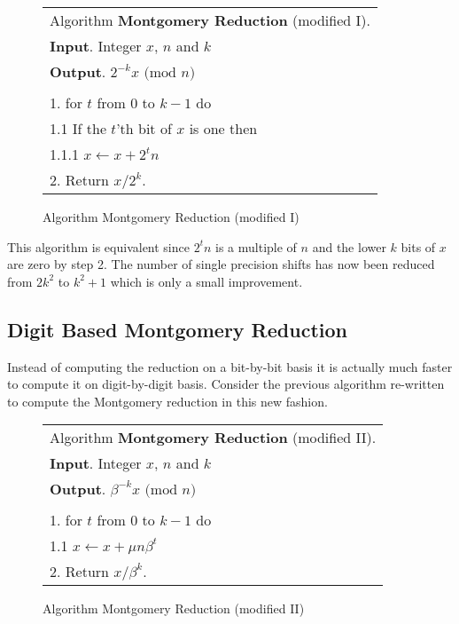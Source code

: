 \documentclass[b5paper]{book}
\begin{document}
\begin{figure}[!here]
\begin{small}
\begin{center}
\begin{tabular}{l}
\hline Algorithm \textbf{Montgomery Reduction} (modified I). \\
\textbf{Input}.   Integer $x$, $n$ and $k$ \\
\textbf{Output}.  $2^{-k}x \mbox{ (mod }n\mbox{)}$ \\
\hline \\
1.  for $t$ from $0$ to $k - 1$ do \\
\hspace{3mm}1.1  If the $t$'th bit of $x$ is one then \\
\hspace{6mm}1.1.1  $x \leftarrow x + 2^tn$ \\
2.  Return $x/2^k$. \\
\hline
\end{tabular}
\end{center}
\end{small}
\caption{Algorithm Montgomery Reduction (modified I)}
\end{figure}

This algorithm is equivalent since $2^tn$ is a multiple of $n$ and the lower $k$ bits of $x$ are zero by step 2.  The number of single
precision shifts has now been reduced from $2k^2$ to $k^2 + 1$ which is only a small improvement.

\subsection{Digit Based Montgomery Reduction}
Instead of computing the reduction on a bit-by-bit basis it is actually much faster to compute it on digit-by-digit basis.  Consider the
previous algorithm re-written to compute the Montgomery reduction in this new fashion.

\begin{figure}[!here]
\begin{small}
\begin{center}
\begin{tabular}{l}
\hline Algorithm \textbf{Montgomery Reduction} (modified II). \\
\textbf{Input}.   Integer $x$, $n$ and $k$ \\
\textbf{Output}.  $\beta^{-k}x \mbox{ (mod }n\mbox{)}$ \\
\hline \\
1.  for $t$ from $0$ to $k - 1$ do \\
\hspace{3mm}1.1  $x \leftarrow x + \mu n \beta^t$ \\
2.  Return $x/\beta^k$. \\
\hline
\end{tabular}
\end{center}
\end{small}
\caption{Algorithm Montgomery Reduction (modified II)}
\end{figure}
\end{document}
